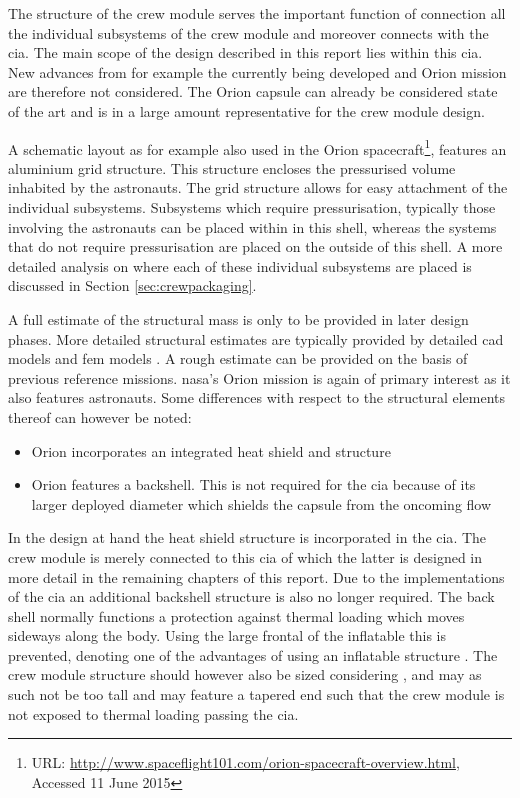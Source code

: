 The structure of the crew module serves the important function of connection all the individual subsystems of the crew module and moreover connects with the \gls{cia}. The main scope of the design described in this report lies within this \gls{cia}. New advances from for example the currently being developed and Orion mission are therefore not considered. The Orion capsule can already be considered state of the art and is in a large amount representative for the crew module design.

A schematic layout as for example also used in the Orion spacecraft\footnote{URL: \url{http://www.spaceflight101.com/orion-spacecraft-overview.html}, Accessed 11 June 2015 }, features an aluminium grid structure. This structure encloses the pressurised volume inhabited by the astronauts. The grid structure allows for easy attachment of the individual subsystems. Subsystems which require pressurisation, typically those involving the astronauts can be placed within in this shell, whereas the systems that do not require pressurisation are placed on the outside of this shell. A more detailed analysis on where each of these individual subsystems are placed is discussed in Section \ref{sec:crewpackaging}.


A full estimate of the structural mass is only to be provided in later design phases. More detailed structural estimates are typically provided by detailed \gls{cad} models and \gls{fem} models \cite{Wertz2011}. A rough estimate can be provided on the basis of previous reference missions. \gls{nasa}'s Orion mission is again of primary interest as it also features astronauts. Some differences with respect to the structural elements thereof can however be noted:

\begin{itemize}
\item Orion incorporates an integrated heat shield and structure
\item Orion features a backshell. This is not required for the \gls{cia} because of its larger deployed diameter which shields the capsule from the oncoming flow
\end{itemize}

In the design at hand the heat shield structure is incorporated in the \gls{cia}. The crew module is merely connected to this \gls{cia} of which the latter is designed in more detail in the remaining chapters of this report. Due to the implementations of the \gls{cia} an additional backshell structure is also no longer required. The back shell normally functions a protection against thermal loading which moves sideways along the body. Using the large frontal of the inflatable this is prevented, denoting one of the advantages of using an inflatable structure \cite{Hughes2005}. The crew module structure should however also be sized considering , and may as such not be too tall and may feature a tapered end such that the crew module is not exposed to thermal loading passing the \gls{cia}.

